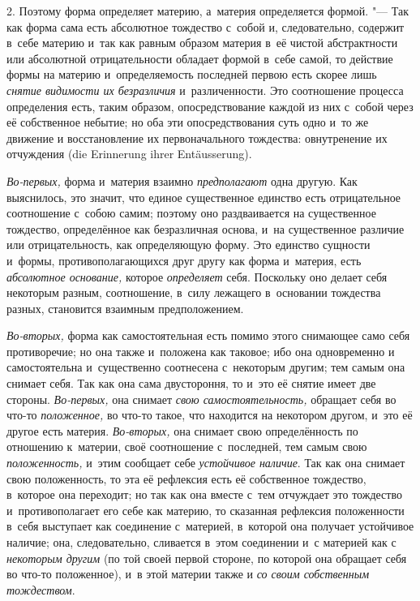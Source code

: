 2. Поэтому форма определяет материю, а~материя определяется формой. "--- Так
как форма сама есть абсолютное тождество с~собой и, следовательно, содержит
в~себе материю и~так как равным образом материя в~её чистой абстрактности или
абсолютной отрицательности обладает формой в~себе самой, то действие формы на
материю и~определяемость последней первою есть скорее лишь
{\em снятие видимости их безразличия} и~различенности. Это соотношение процесса
определения есть, таким образом, опосредствование каждой из них с~собой через
её собственное небытие; но оба эти опосредствования суть одно и~то же движение
и восстановление их первоначального тождества: овнутренение их отчуждения (die
Erinne\-rung ihrer Entäus\-se\-rung).

{\em Во-первых,} форма и~материя взаимно {\em предполагают} одна другую. Как
выяснилось, это значит, что единое существенное единство есть отрицательное
соотношение с~собою самим; поэтому оно раздваивается на существенное тождество,
определённое как безразличная основа, и~на существенное различие или
отрицательность, как определяющую форму. Это единство сущности и~формы,
противополагающихся друг другу как форма и~материя, есть
{\em абсолютное основание,} которое {\em определяет} себя. Поскольку оно делает
себя некоторым разным, соотношение, в~силу лежащего в~основании тождества
разных, становится взаимным предположением.

{\em Во-вторых,} форма как самостоятельная есть помимо этого снимающее само
себя противоречие; но она также и~положена как таковое; ибо она одновременно и
самостоятельна и~существенно соотнесена с~некоторым другим; тем самым она
снимает себя. Так как она сама двустороння, то и~это её снятие имеет две
стороны. {\em Во-первых,} она снимает {\em свою самостоятельность,} обращает
себя во что-то {\em положенное,} во что-то такое, что находится на некотором
другом, и~это её другое есть материя. {\em Во-вторых,} она снимает свою
определённость по отношению к~материи, своё соотношение с~последней, тем самым
свою {\em положенность,} и~этим сообщает себе {\em устойчивое наличие}. Так как
она снимает свою положенность, то эта её рефлексия есть её собственное
тождество, в~которое она переходит; но так как она вместе с~тем отчуждает это
тождество и~противополагает его себе как материю, то сказанная рефлексия
положенности в~себя выступает как соединение с~материей, в~которой она получает
устойчивое наличие; она, следовательно, сливается в~этом соединении и~с
материей как с {\em некоторым другим} (по той своей первой стороне, по которой
она обращает себя во что-то положенное), и~в этой материи также и
{\em со своим собственным тождеством}.


